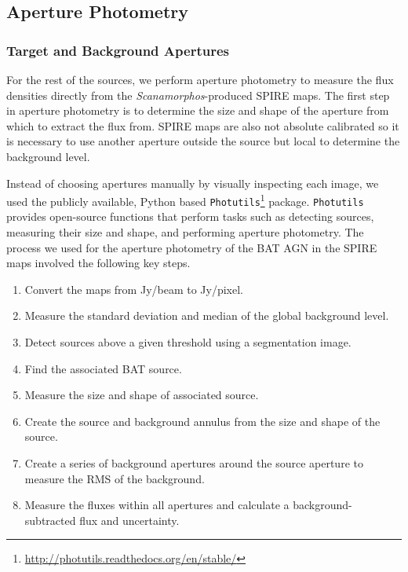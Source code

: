 \subsection{Aperture Photometry}\label{aperture}
\subsubsection{Target and Background Apertures}
For the rest of the sources, we perform aperture photometry to measure the flux densities directly from the \textit{Scanamorphos}-produced SPIRE maps. The first step in aperture photometry is to determine the size and shape of the aperture from which to extract the flux from. SPIRE maps are also not absolute calibrated so it is necessary to use another aperture outside the source but local to determine the background level.

Instead of choosing apertures manually by visually inspecting each image, we used the publicly available, Python based \texttt{Photutils}\footnote{\url{http://photutils.readthedocs.org/en/stable/}} package. \texttt{Photutils} provides open-source functions that perform tasks such as detecting sources, measuring their size and shape, and performing aperture photometry. The process we used for the aperture photometry of the BAT AGN in the SPIRE maps involved the following key steps.

\begin{enumerate}
    \item Convert the maps from Jy/beam to Jy/pixel.
    \item Measure the standard deviation and median of the global background level.
    \item Detect sources above a given threshold using a segmentation image.
    \item Find the associated BAT source.
    \item Measure the size and shape of associated source.
    \item Create the source and background annulus from the size and shape of the source.
    \item Create a series of background apertures around the source aperture to measure the RMS of the background.
    \item Measure the fluxes within all apertures and calculate a background-subtracted flux and uncertainty.
\end{enumerate}
  
  
  